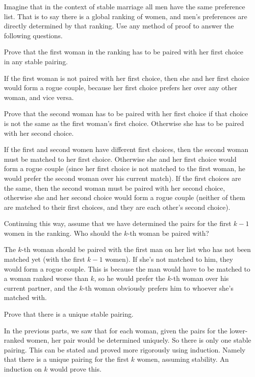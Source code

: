 \question Imagine that in the context of stable marriage all 
men have the same preference list. That is to say there is a 
global ranking of women, and men's preferences are directly 
determined by that ranking.
Use any method of proof to answer the following questions.

\begin{questions}
\item Prove that the first woman in the ranking has to be paired with 
her first choice in any stable pairing.
\begin{solution} [1.2 in]
 If the first woman is not paired with her first choice, then she and 
 her first choice would form a rogue couple, because her first choice 
 prefers her over any other woman, and vice versa.
\end{solution}

\item Prove that the second woman has to be paired with her first 
choice if that choice is not the same as the first woman's first choice. 
Otherwise she has to be paired with her second choice.
\begin{solution}[1.2 in]
If the first and second women have different first choices, then the 
second woman must be matched to her first choice. Otherwise she and her 
first choice would form a rogue couple (since her first choice is not 
matched to the first woman, he would prefer the second woman over his 
current match).
If the first choices are the same, then the second woman must be paired 
with her second choice, otherwise she and her second choice would form 
a rogue couple (neither of them are matched to their first choices, 
and they are each other's second choice).
\end{solution}

\item Continuing this way, assume that we have determined the pairs 
for the first $k-1$ women in the ranking. Who should the $k$-th woman 
be paired with?
\begin{solution}[1.2 in]
The $k$-th woman should be paired with the first man on her list who 
has not been matched yet (with the first $k-1$ women). If she's not 
matched to him, they would form a rogue couple. This is because the 
man would have to be matched to a woman ranked worse than $k$, so he 
would prefer the $k$-th woman over his current partner, and the $k$-th 
woman obviously prefers him to whoever she's matched with.
\end{solution}

\item  Prove that there is a unique stable pairing.
\begin{solution}
In the previous parts, we saw that for each woman, given the pairs 
for the lower-ranked women, her pair would be determined uniquely. So 
there is only one stable pairing.
This can be stated and proved more rigorously using induction. Namely 
that there is a unique pairing for the first $k$ women, assuming 
stability. An induction on $k$ would prove this.
\end{solution}
\end{questions}